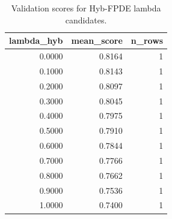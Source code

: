 \begin{table}[t]
\caption{Validation scores for Hyb-FPDE lambda candidates.}
\label{tab:lambda_distribution_computed}
\centering
\begin{tabular}{rrr}
\toprule
lambda\_hyb & mean\_score & n\_rows \\
\midrule
0.0000 & 0.8164 & 1 \\
0.1000 & 0.8143 & 1 \\
0.2000 & 0.8097 & 1 \\
0.3000 & 0.8045 & 1 \\
0.4000 & 0.7975 & 1 \\
0.5000 & 0.7910 & 1 \\
0.6000 & 0.7844 & 1 \\
0.7000 & 0.7766 & 1 \\
0.8000 & 0.7662 & 1 \\
0.9000 & 0.7536 & 1 \\
1.0000 & 0.7400 & 1 \\
\bottomrule
\end{tabular}

\end{table}

